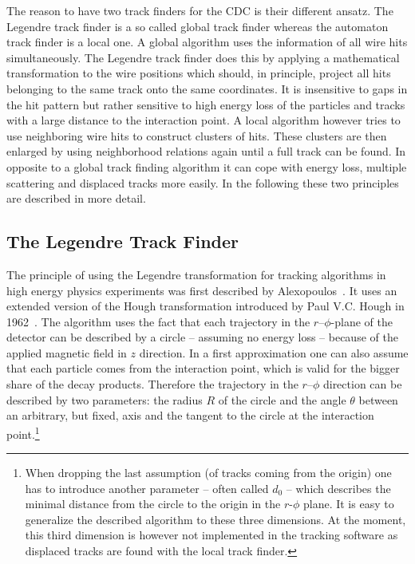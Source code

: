 The reason to have two track finders for the CDC is their different ansatz. The Legendre track finder is a so called global track finder whereas the automaton track finder is a local one. A global algorithm uses the information of all wire hits simultaneously. The Legendre track finder does this by applying a mathematical transformation to the wire positions which should, in principle, project all hits belonging to the same track onto the same coordinates. It is insensitive to gaps in the hit pattern but rather sensitive to high energy loss of the particles and tracks with a large distance to the interaction point. A local algorithm however tries to use neighboring wire hits to construct clusters of hits. These clusters are then enlarged by using neighborhood relations again until a full track can be found. In opposite to a global track finding algorithm it can cope with energy loss, multiple scattering and displaced tracks more easily. In the following these two principles are described in more detail.


\subsection{The Legendre Track Finder}
The principle of using the Legendre transformation for tracking algorithms in high energy physics experiments was first described by Alexopoulos~\cite{legendre}. It uses an extended version of the Hough transformation introduced by Paul V.C. Hough in 1962~\cite{hough}. The algorithm uses the fact that each trajectory in the $r$--$\phi$-plane of the detector can be described by a circle -- assuming no energy loss -- because of the applied magnetic field in $z$ direction. In a first approximation one can also assume that each particle comes from the interaction point, which is valid for the bigger share of the decay products. Therefore the trajectory in the $r$--$\phi$ direction can be described by two parameters: the radius $R$ of the circle and the angle $\theta$ between an arbitrary, but fixed, axis and the tangent to the circle at the interaction point.\footnote{When dropping the last assumption (of tracks coming from the origin) one has to introduce another parameter -- often called $d_0$ -- which describes the minimal distance from the circle to the origin in the $r$-$\phi$ plane. It is easy to generalize the described algorithm to these three dimensions. At the moment, this third dimension is however not implemented in the tracking software as displaced tracks are found with the local track finder.}

